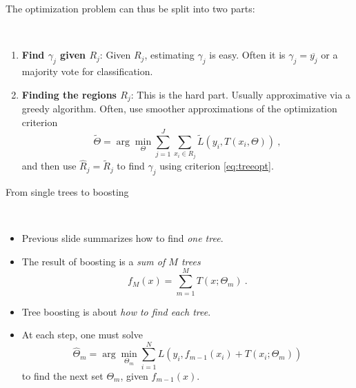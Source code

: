 \documentclass[
  10pt,
  ignorenonframetext,
]{beamer}
\providecommand{\tightlist}{%
  \setlength{\itemsep}{0pt}\setlength{\parskip}{0pt}}
\begin{document}
\begin{frame}
\label{sl:regions}

The optimization problem can thus be split into two parts:

\(~\)

\begin{enumerate}
[1)]
\tightlist
\item
  \textbf{Find \(\gamma_j\) given \(R_j\)}: Given \(R_j\), estimating
  \(\gamma_j\) is easy. Often it is \(\gamma_j=\overline{y_j}\) or a
  majority vote for classification.
\end{enumerate}

\vspace{2mm}

\begin{enumerate}
[1)]
\setcounter{enumi}{1}
\tightlist
\item
  \textbf{Finding the regions \(R_j\)}: This is the hard part. Usually
  approximative via a greedy algorithm. Often, use smoother
  approximations of the optimization criterion
  \begin{equation}\label{eq:approx}
  \tilde\Theta = \arg \min_\Theta \sum_{j=1}^J \sum_{x_i \in R_j} \tilde{L}(y_i,T(x_i,\Theta)) \ , 
  \end{equation} and then use \(\hat{R}_j=\tilde{R}_j\) to find
  \(\gamma_j\) using criterion \eqref{eq:treeopt}.
\end{enumerate}
\end{frame}

\begin{frame}
\begin{block}{From single trees to boosting}
\protect\hypertarget{from-single-trees-to-boosting}{}
\label{sl:toBoosting}

\(~\)

\begin{itemize}
\tightlist
\item
  Previous slide summarizes how to find \emph{one tree}.
\end{itemize}

\vspace{2mm}

\begin{itemize}
\item
  The result of boosting is a \emph{sum of \(M\) trees}
  \[f_M(x) = \sum_{m=1}^M T(x;\Theta_m) \ .\] \vspace{2mm}
\item
  Tree boosting is about \emph{how to find each tree}.
\end{itemize}

\vspace{2mm}

\begin{itemize}
\tightlist
\item
  At each step, one must solve \begin{equation}\label{eq:boosted}
  \hat\Theta_m = \arg \min_{\Theta_m} \sum_{i=1}^N L\left(y_i, f_{m-1}(x_i) + T(x_i;\Theta_m)\right) 
  \end{equation} to find the next set \(\Theta_m\), given
  \(f_{m-1}(x)\).
\end{itemize}
\end{block}
\end{frame}
\end{document}

